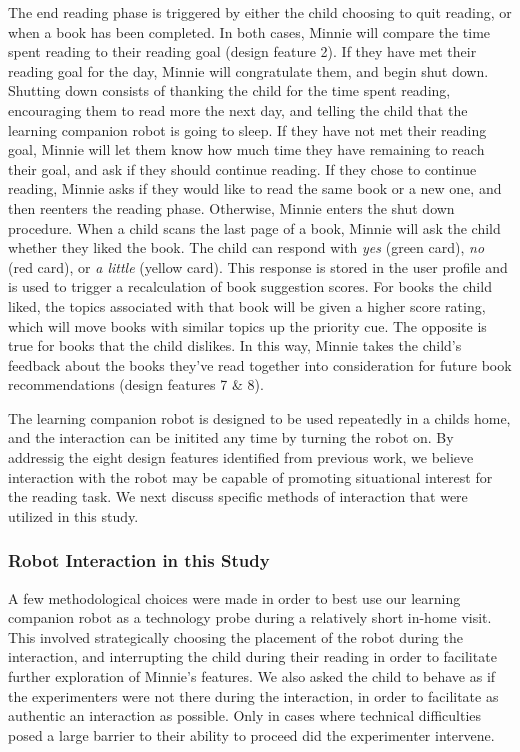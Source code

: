 \documentclass{sigchi}
\begin{document}
The end reading phase is triggered by either the child choosing to quit reading, or when a book has been completed. In both cases, Minnie will compare the time spent reading to their reading goal (design feature 2). If they have met their reading goal for the day, Minnie will congratulate them, and begin shut down. Shutting down consists of thanking the child for the time spent reading, encouraging them to read more the next day, and telling the child that the learning companion robot is going to sleep. If they have not met their reading goal, Minnie will let them know how much time they have remaining to reach their goal, and ask if they should continue reading. If they chose to continue reading, Minnie asks if they would like to read the same book or a new one, and then reenters the reading phase. Otherwise, Minnie enters the shut down procedure. When a child scans the last page of a book, Minnie will ask the child whether they liked the book. The child can respond with \textit{yes} (green card), \textit{no} (red card), or \textit{a little} (yellow card). This response is stored in the user profile and is used to trigger a recalculation of book suggestion scores. For books the child liked, the topics associated with that book will be given a higher score rating, which will move books with similar topics up the priority cue. The opposite is true for books that the child dislikes. In this way, Minnie takes the child's feedback about the books they've read together into consideration for future book recommendations (design features 7 \& 8).

The learning companion robot is designed to be used repeatedly in a childs home, and the interaction can be initited any time by turning the robot on. By addressig the eight design features identified from previous work, we believe interaction with the robot may be capable of promoting situational interest for the reading task. We next discuss specific methods of interaction that were utilized in this study.

\subsubsection{Robot Interaction in this Study}
A few methodological choices were made in order to best use our learning companion robot as a technology probe during a relatively short in-home visit. This involved strategically choosing the placement of the robot during the interaction, and interrupting the child during their reading in order to facilitate further exploration of Minnie's features. We also asked the child to behave as if the experimenters were not there during the interaction, in order to facilitate as authentic an interaction as possible. Only in cases where technical difficulties posed a large barrier to their ability to proceed did the experimenter intervene.
\end{document}

